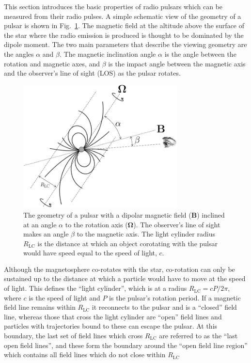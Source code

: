 This section introduces the basic properties of radio pulsars which can be measured from their radio pulses. A simple schematic view of the geometry of a pulsar is shown in Fig.~\ref{fig: intro - basic geometry}. The magnetic field at the altitude above the surface of the star where the radio emission is produced is thought to be dominated by the dipole moment. The two main parameters that describe the viewing geometry are the angles $\alpha$ and $\beta$. The magnetic inclination angle $\alpha$ is the angle between the rotation and magnetic axes, and $\beta$ is the impact angle between the magnetic axis and the observer's line of sight (LOS) as the pulsar rotates. 
\begin{figure}
    \begin{center}
        \includegraphics[width=0.75\textwidth]{Figures/Introduction/pulsar_geometry}
        \caption[The basic geometry of a radio pulsar]{The geometry of a pulsar with a dipolar magnetic field ($\mathbf{B}$) inclined at an angle $\alpha$ to the rotation axis ($\mathbf{\Omega}$). The observer's line of sight makes an angle $\beta$ to the magnetic axis. The light cylinder radius $R_\mathrm{LC}$ is the distance at which an object corotating with the pulsar would have speed equal to the speed of light, $c$.}
        \label{fig: intro - basic geometry}
    \end{center}
\end{figure}
Although the magnetosphere co-rotates with the star, co-rotation can only be sustained up to the distance at which a particle would have to move at the speed of light. This defines the ``light cylinder'', which is at a radius $R_\mathrm{LC} = cP/2\pi$, where $c$ is the speed of light and $P$ is the pulsar's rotation period. If a magnetic field line remains within $R_\mathrm{LC}$ it reconnects to the pulsar and is a ``closed'' field line, whereas those that cross the light cylinder are ``open'' field lines and particles with trajectories bound to these can escape the pulsar. At this boundary, the last set of field lines which cross $R_\mathrm{LC}$ are referred to as the ``last open field lines'', and these form the boundary around the ``open field line region'' which contains all field lines which do not close within $R_\mathrm{LC}$

